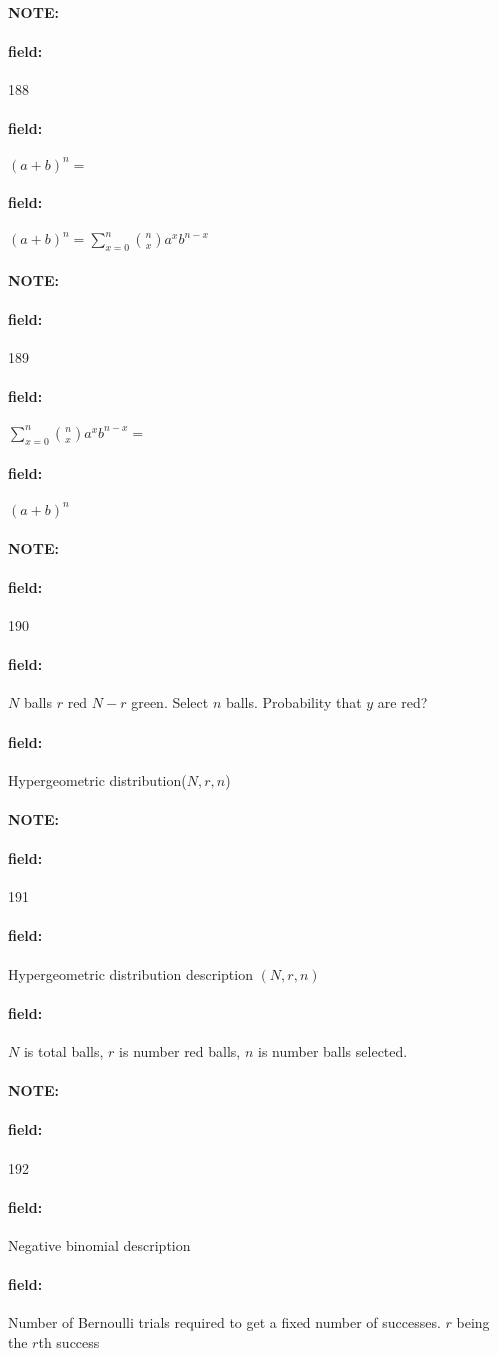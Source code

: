 \documentclass[12pt]{article}
\newenvironment{note}{\paragraph{NOTE:}}{}
\newenvironment{field}{\paragraph{field:}}{}
\begin{document}
\begin{note} \begin{field} \tiny 188 \end{field}
  \begin{field}
    $(a + b)^n = $
  \end{field}
  \begin{field}
    $(a + b)^n = \sum_{x = 0}^n \binom{n}{x}a^xb^{n-x}$
  \end{field}
\end{note}

\begin{note} \begin{field} \tiny 189 \end{field}
  \begin{field}
    $\sum_{x = 0}^n \binom{n}{x}a^xb^{n-x} = $
  \end{field}
  \begin{field}
    $(a + b)^n$
  \end{field}
\end{note}

\begin{note} \begin{field} \tiny 190 \end{field}
  \begin{field}
    $N$ balls $r$ red $N - r$ green. Select $n$ balls. Probability that $y$ are red?
  \end{field}
  \begin{field}
    Hypergeometric distribution($N,r,n$)
  \end{field}
\end{note}

\begin{note} \begin{field} \tiny 191 \end{field}
  \begin{field}
    Hypergeometric distribution description $(N,r,n)$
  \end{field}
  \begin{field}
    $N$ is total balls, $r$ is number red balls, $n$ is number balls selected.
  \end{field}
\end{note}

\begin{note} \begin{field} \tiny 192 \end{field}
  \begin{field}
    Negative binomial description
  \end{field}
  \begin{field}
    Number of Bernoulli trials required to get a fixed number of successes. $r$ being the $r$th success
  \end{field}
\end{note}
\end{document}
